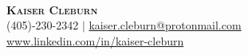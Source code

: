 \documentclass[letterpaper,12pt]{article} %
\begin{document}
\begin{comment}
In Europe it is common to include a picture of ones self in the CV. Select
which heading appropriate for the document you are creating.
\end{comment}

\begin{minipage}[c]{0.05\textwidth}
\-\
\end{minipage}

\begin{center}
    \textbf{\Huge \scshape Kaiser Cleburn} \\ \vspace{1pt} %
    \small (405)-230-2342 $|$ 
    \href{mailto:kaiser.cleburn@protonmail.com}{kaiser.cleburn@protonmail.com} \\
	\url{www.linkedin.com/in/kaiser-cleburn}
\end{center}
\end{document}
